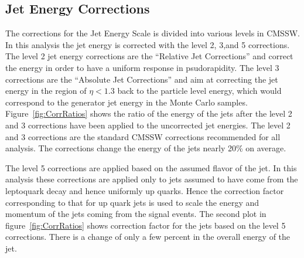 \documentclass{cmspaper}
\begin{document}
\subsection{Jet Energy Corrections}

The corrections for the Jet Energy Scale is divided into various levels in CMSSW.  In this analysis the jet energy is corrected with the level 2, 3,and 5 corrections.  The level 2 jet energy corrections are the ``Relative Jet Corrections'' and correct the energy in order to have a uniform response in psudorapidity.  The level 3 corrections are the ``Absolute Jet Corrections'' and aim at correcting the jet energy in the region of $\eta < 1.3$ back to the particle level energy, which would correspond to the generator jet energy in the Monte Carlo samples. Figure~\ref{fig:CorrRatios} shows the ratio of the energy of the jets after the level 2 and 3 corrections have been applied to the uncorrected jet energies.  The level 2 and 3 corrections are the standard CMSSW corrections recommended for all analysis.  The corrections change the energy of the jets nearly 20\% on average.

The level 5 corrections are applied based on the assumed flavor of the jet.  In this analysis these corrections are applied only to jets assumed to have come from the leptoquark decay and hence uniformly up quarks.  Hence the correction factor corresponding to that for up quark jets is used to scale the energy and momentum of the jets coming from the signal events.  The second plot in figure~\ref{fig:CorrRatios} shows correction factor for the jets based on the level 5 corrections.  There is a change of only a few percent in the overall energy of the jet.
\end{document}
